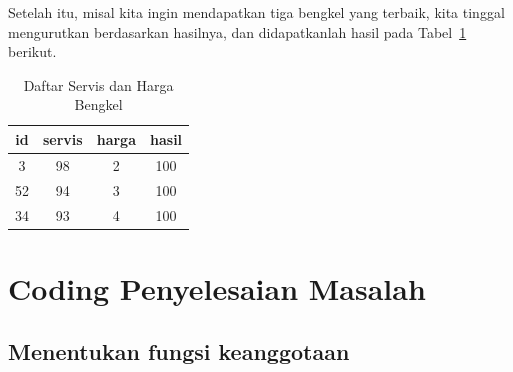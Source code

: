 \documentclass[12pt,a4paper]{article}
\theoremstyle{remark}
\begin{document}
Setelah itu, misal kita ingin mendapatkan tiga bengkel yang terbaik, kita tinggal mengurutkan berdasarkan hasilnya, dan didapatkanlah hasil pada Tabel~\ref{tab:hasil_terbaik} berikut.


\begin{table}[H]
    \centering
    \caption{Daftar Servis dan Harga Bengkel}
    \label{tab:hasil_terbaik}
    \begin{tabular}{|c|c|c|c|}
        \hline
        \textbf{id} & \textbf{servis} & \textbf{harga} & \textbf{hasil} \\ \hline
        3           & 98              & 2              & 100            \\
        52          & 94              & 3              & 100            \\
        34          & 93              & 4              & 100            \\
        \hline
    \end{tabular}
\end{table}


\section{Coding Penyelesaian Masalah}
\subsection*{Menentukan fungsi keanggotaan}
\end{document}
